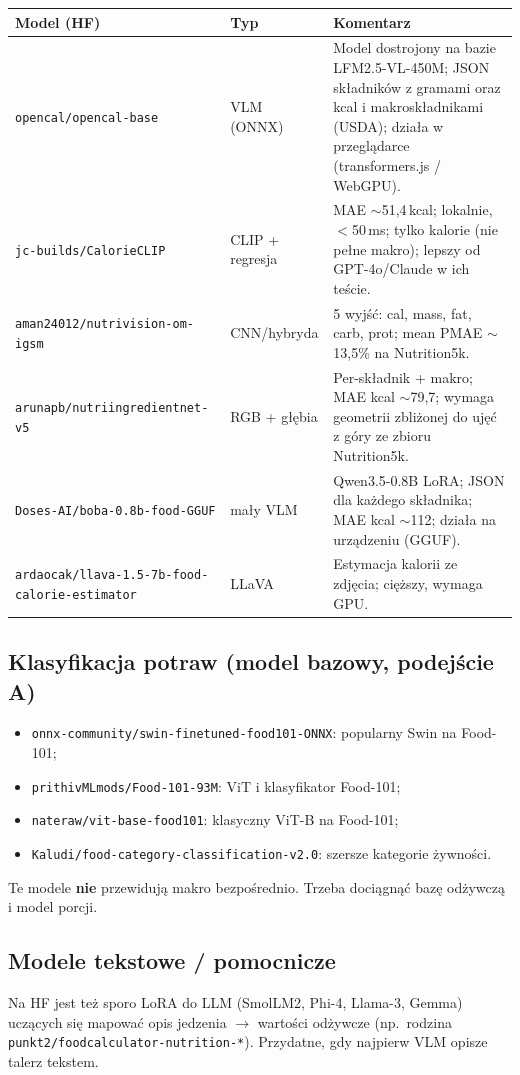 \documentclass[11pt,a4paper]{article}
\begin{document}
\scriptsize
\begin{longtable}{@{}p{5.8cm}p{2.4cm}p{6.0cm}@{}}
\toprule
\textbf{Model (HF)} & \textbf{Typ} & \textbf{Komentarz} \\
\midrule
\endhead
\texttt{opencal/opencal-base} & VLM (ONNX) &
  Model dostrojony na bazie LFM2.5-VL-450M; JSON składników z gramami
  oraz kcal i makroskładnikami (USDA); działa w przeglądarce
  (transformers.js / WebGPU). \\
\texttt{jc-builds/CalorieCLIP} & CLIP + regresja &
  MAE $\sim$51{,}4\,kcal; lokalnie, $<$50\,ms; tylko kalorie (nie pełne makro);
  lepszy od GPT-4o/Claude w ich teście. \\
\texttt{aman24012/nutrivision-om-igsm} & CNN/hybryda &
  5 wyjść: cal, mass, fat, carb, prot; mean PMAE $\sim$13{,}5\% na Nutrition5k. \\
\texttt{arunapb/nutriingredientnet-v5} & RGB + głębia &
  Per-składnik + makro; MAE kcal $\sim$79{,}7; wymaga geometrii zbliżonej
  do ujęć z góry ze zbioru Nutrition5k. \\
\texttt{Doses-AI/\allowbreak boba-0.8b-food-GGUF} & mały VLM &
  Qwen3.5-0.8B LoRA; JSON dla każdego składnika; MAE kcal $\sim$112;
  działa na urządzeniu (GGUF). \\
\texttt{ardaocak/llava-1.5-7b-food-\allowbreak calorie-estimator} & LLaVA &
  Estymacja kalorii ze zdjęcia; cięższy, wymaga GPU. \\
\bottomrule
\end{longtable}
\normalsize

\subsection{Klasyfikacja potraw (model bazowy, podejście A)}

\begin{itemize}[leftmargin=*]
  \item \texttt{onnx-community/swin-finetuned-food101-ONNX}: popularny Swin na Food-101;
  \item \texttt{prithivMLmods/Food-101-93M}: ViT i klasyfikator Food-101;
  \item \texttt{nateraw/vit-base-food101}: klasyczny ViT-B na Food-101;
  \item \texttt{Kaludi/food-category-classification-v2.0}: szersze kategorie żywności.
\end{itemize}
Te modele \textbf{nie} przewidują makro bezpośrednio. Trzeba dociągnąć
bazę odżywczą i model porcji.

\subsection{Modele tekstowe / pomocnicze}
Na HF jest też sporo LoRA do LLM (SmolLM2, Phi-4, Llama-3, Gemma)
uczących się mapować opis jedzenia $\rightarrow$ wartości odżywcze
(np.\ rodzina \texttt{punkt2/foodcalculator-nutrition-*}).
Przydatne, gdy najpierw VLM opisze talerz tekstem.
\end{document}
